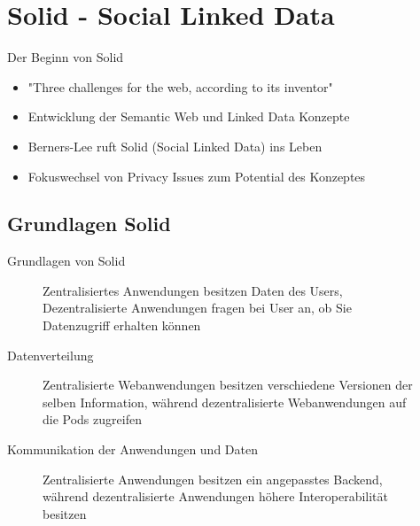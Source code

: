 \documentclass{beamer}              %
\begin{document}
\section{Solid - Social Linked Data}
\begin{frame}{Der Beginn von Solid}
\begin{itemize}
    \item "Three challenges for the web, according to its inventor" \cite{webfoundation2017}
    \item Entwicklung der Semantic Web und Linked Data Konzepte \cite{bernerslee1998semanticwebroadmap}
    \item Berners-Lee ruft Solid (Social Linked Data) ins Leben
    \item Fokuswechsel von Privacy Issues zum Potential des Konzeptes
\end{itemize}
\end{frame}

\subsection{Grundlagen Solid}
\begin{frame}{Grundlagen von Solid}
\begin{figure}[htbp]
  \centering
  
  \caption{Zentralisiertes Anwendungen besitzen Daten des Users, Dezentralisierte Anwendungen fragen bei User an, ob Sie Datenzugriff erhalten können}
\end{figure}
\end{frame}

\begin{frame}{Datenverteilung}
\begin{figure}[htbp]
  
  \caption{Zentralisierte Webanwendungen besitzen verschiedene Versionen der selben Information, während dezentralisierte Webanwendungen auf die Pods zugreifen}
\end{figure}
\end{frame}

\begin{frame}{Kommunikation der Anwendungen und Daten}
\begin{figure}[htbp]
  
  \caption{Zentralisierte Anwendungen besitzen ein angepasstes Backend, während dezentralisierte Anwendungen höhere Interoperabilität besitzen}
\end{figure}
\end{frame}
\end{document}
